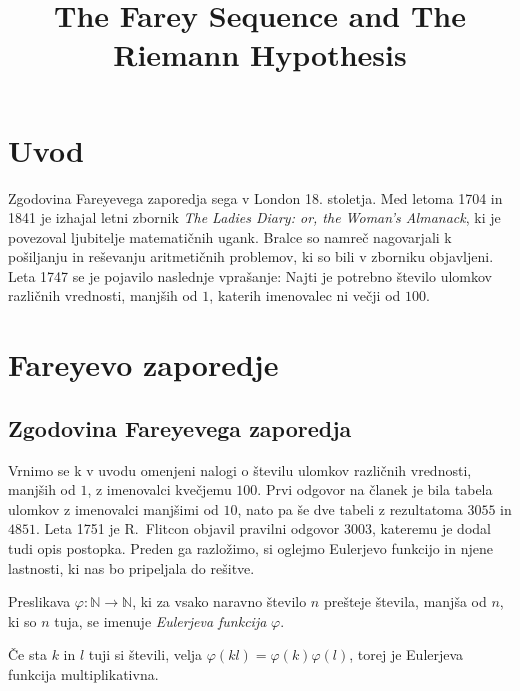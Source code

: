 \documentclass[mat1]{fmfdelo}
\title{The Farey Sequence and The Riemann Hypothesis}
\begin{document}
%
\section{Uvod}

Zgodovina Fareyevega zaporedja sega v London 18. stoletja. Med letoma 1704 in 1841 je izhajal letni zbornik \emph{The Ladies Diary: or, the Woman's Almanack}, ki je povezoval ljubitelje matematičnih ugank. Bralce so namreč nagovarjali k pošiljanju in reševanju aritmetičnih problemov, ki so bili v zborniku objavljeni. Leta 1747 se je pojavilo naslednje vprašanje: Najti je potrebno število ulomkov različnih vrednosti, manjših od $1$, katerih imenovalec ni večji od $100$.

%
\section{Fareyevo zaporedje}

%
\subsection{Zgodovina Fareyevega zaporedja}

Vrnimo se k v uvodu omenjeni nalogi o številu ulomkov različnih vrednosti, manjših od $1$, z imenovalci kvečjemu $100$. Prvi odgovor na članek je bila tabela ulomkov z imenovalci manjšimi od $10$, nato pa še dve tabeli z rezultatoma $3055$ in $4851$. Leta 1751 je R.~Flitcon objavil pravilni odgovor $3003$, kateremu je dodal tudi opis postopka. Preden ga razložimo, si oglejmo Eulerjevo funkcijo in njene lastnosti, ki nas bo pripeljala do rešitve. 
%

\begin{definicija}
Preslikava \( \varphi \colon \mathbb{N} \rightarrow \mathbb{N}\), ki za vsako naravno število $n$ prešteje števila, manjša od $n$, ki so $n$ tuja, se imenuje \emph{Eulerjeva funkcija} $\varphi$.
\end{definicija}

\begin{trditev}
\label{trd:MultipEuler}
Če sta $k$ in $l$ tuji si števili, velja $\varphi (kl) = \varphi (k) \varphi (l)$, torej je Eulerjeva funkcija multiplikativna.
\end{trditev}
\end{document}
